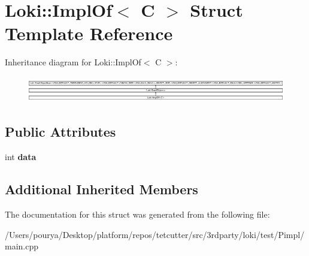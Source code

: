 \hypertarget{structLoki_1_1ImplOf_3_01C_01_4}{}\section{Loki\+:\+:Impl\+Of$<$ C $>$ Struct Template Reference}
\label{structLoki_1_1ImplOf_3_01C_01_4}
Inheritance diagram for Loki\+:\+:Impl\+Of$<$ C $>$\+:\begin{figure}[H]
\begin{center}
\leavevmode
\includegraphics[height=1.150685cm]{structLoki_1_1ImplOf_3_01C_01_4}
\end{center}
\end{figure}
\subsection*{Public Attributes}
\begin{DoxyCompactItemize}
\item 
\hypertarget{structLoki_1_1ImplOf_3_01C_01_4_a56535d2f4c85783b5745f5ae17fb1556}{}int {\bfseries data}\label{structLoki_1_1ImplOf_3_01C_01_4_a56535d2f4c85783b5745f5ae17fb1556}

\end{DoxyCompactItemize}
\subsection*{Additional Inherited Members}


The documentation for this struct was generated from the following file\+:\begin{DoxyCompactItemize}
\item 
/\+Users/pourya/\+Desktop/platform/repos/tetcutter/src/3rdparty/loki/test/\+Pimpl/main.\+cpp\end{DoxyCompactItemize}

